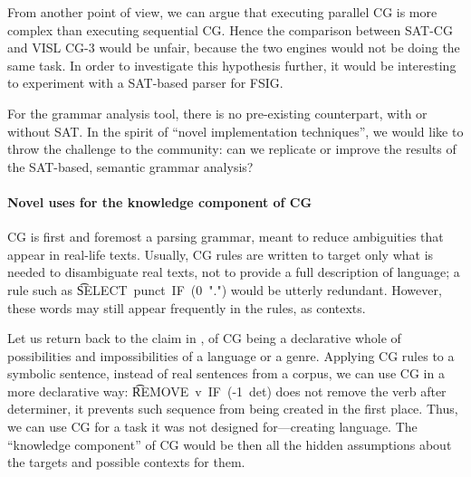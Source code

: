From another point of view, we can argue that executing parallel CG is more complex than executing sequential CG.
Hence the comparison between SAT-CG and VISL CG-3 would be unfair, because the two 
engines would not be doing the same task. In order to investigate this hypothesis further, it would be interesting to experiment with a SAT-based parser for FSIG.

For the grammar analysis tool, there is no pre-existing counterpart, with or without SAT. 
In the spirit of ``novel implementation techniques'', we would like to throw the challenge to the community: can we replicate or improve the results of the SAT-based,
semantic grammar analysis? 

\paragraph{Novel uses for the knowledge component of CG} 

CG is first and foremost a parsing grammar, meant to reduce ambiguities that appear in real-life texts. 
Usually, CG rules are written to target only what is needed to disambiguate real texts, not to provide a full description of language;  
a rule such as \t{SELECT~punct~IF~(0~".")} would be utterly redundant. However, these words may still appear frequently in the rules, as contexts. 

Let us return back to the claim in \cite{bick2015}, of CG being a declarative whole of possibilities and impossibilities of a language or a genre. 
Applying CG rules to a symbolic sentence, instead of real sentences from a corpus, 
we can use CG in a more declarative way: \t{REMOVE~v~IF~(-1~det)} does not remove the 
verb after determiner, it prevents such sequence from being created in the first place. 
Thus, we can use CG for a task it was not designed for---creating language.
The ``knowledge component'' of CG would be then all the hidden assumptions 
about the targets and possible contexts for them.


